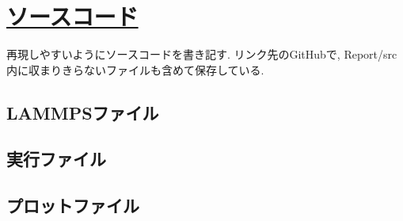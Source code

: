 \chapter{\href{https://github.com/m-agnet/Report.git}{ソースコード}}

再現しやすいようにソースコードを書き記す. リンク先のGitHubで, Report/src内に収まりきらないファイルも含めて保存している.

\section{LAMMPSファイル}



\section{実行ファイル}




\section{プロットファイル}


